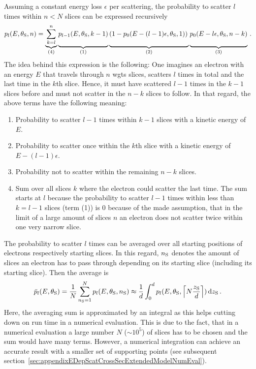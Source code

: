 Assuming a constant energy loss $\epsilon$ per scattering, the probability to scatter $l$ times within $n<N$ slices can be expressed recursively
\begin{equation}
	\label{eq:appendixEDepScatCrossSecExtendedModelFormalismCore}
    p_l(E,\thetaSource,n) =
    \underbrace{
        \sum_{k=l}^{n}
    }_{(4)}
    \underbrace{
        p_{l-1}(E,\thetaSource,k-1)
        \vphantom{\sum_{k=l}^{n}}
    }_{(1)}
    \underbrace{
    \left(
        1-p_0(E-(l-1)\epsilon,\thetaSource,1)
    \right)
    \vphantom{\sum_{k=l}^{n}}
    }_{(2)}
    \underbrace{
        p_0(E-l\epsilon,\thetaSource,n-k)
        \vphantom{\sum_{k=l}^{n}}
    }_{(3)}
    \fullstop
\end{equation}
The idea behind this expression is the following: One imagines an electron with an energy $E$ that travels through $n$ \gls{wgts} slices, scatters $l$ times in total and the last time in the $k$th slice. Hence, it must have scattered $l-1$ times in the $k-1$ slices before and must not scatter in the $n-k$ slices to follow. In that regard, the above terms have the following meaning:
\begin{enumerate}[(1)]
    \item Probability to scatter $l-1$ times within $k-1$ slices with a kinetic energy of $E$.
    \item Probability to scatter once within the $k$th slice with a kinetic energy of $E-(l-1)\epsilon$.
    \item Probability not to scatter within the remaining $n-k$ slices.
    \item Sum over all slices $k$ where the electron could scatter the last time. The sum starts at $l$ because the probability to scatter $l-1$ times within less than $k=l-1$ slices (term (1)) is 0 because of the made assumption, that in the limit of a large amount of slices $n$ an electron does not scatter twice within one very narrow slice.
\end{enumerate}
The probability to scatter $l$ times can be averaged over all starting positions of electrons respectively starting slices. In this regard, $n_\mathrm{S}$ denotes the amount of slices an electron has to pass through depending on its starting slice (including its starting slice). Then the average is
\begin{equation}
    \label{eq:appendixEDepScatCrossSecExtendedModelFormalismZAverage}
    \bar{p}_l(E,\theta_\mathrm{S}) = 
    \frac{1}{N}
    \sum_{n_\mathrm{S}=1}^{N} p_l(E,\theta_\mathrm{S},n_\mathrm{S}) \approx
    \frac{1}{d}
    \int_{0}^{d}
        p_l(E,\theta_\mathrm{S},
            \left\lceil N \frac{z_\mathrm{S}}{d}\right\rceil
        )
    \mathop{}\!\mathrm{d} z_\mathrm{S}
    \text{\,.}
\end{equation}
Here, the averaging sum is approximated by an integral as this helps cutting down on run time in a numerical evaluation. This is due to the fact, that in a numerical evaluation a large number $N$ ($\sim10^5$) of slices has to be chosen and the sum would have many terms. However, a numerical integration can achieve an accurate result with a smaller set of supporting points (see subsequent section~\ref{sec:appendixEDepScatCrossSecExtendedModelNumEval}). 

